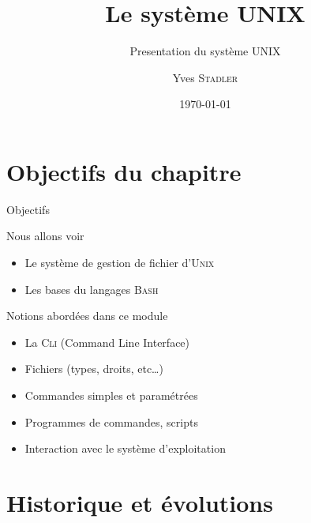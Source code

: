
\title{Le système UNIX}
\subtitle{Presentation du système UNIX}

\author{Yves \textsc{Stadler}}

\date{\today}






\begin{frame}
\titlepage
\end{frame}


\section{Objectifs du chapitre}
\begin{frame}{Objectifs}
\begin{alertblock}{Nous allons voir}
\begin{itemize}
\item Le système de gestion de fichier d'\textsc{Unix}
\item Les bases du langages \textsc{Bash}
\end{itemize}
\end{alertblock}

\begin{block}{Notions abordées dans ce module}
\begin{itemize}
\item La \textsc{Cli} (Command Line Interface)
\item Fichiers (types, droits, etc\ldots)
\item Commandes simples et paramétrées
\item Programmes de commandes, scripts
\item Interaction avec le système d’exploitation
\end{itemize}
\end{block}
\end{frame}

\section{Historique et évolutions}
